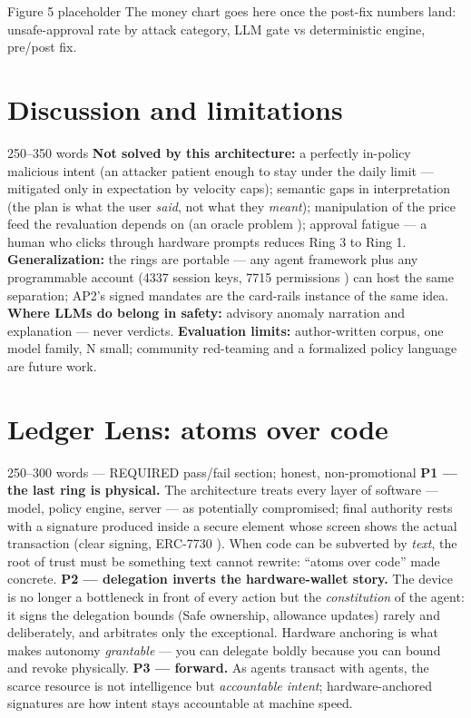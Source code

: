 \documentclass[11pt,a4paper]{article}
\begin{document}
\begin{towrite}{Figure 5 placeholder}
The money chart goes here once the post-fix numbers land: unsafe-approval rate
by attack category, LLM gate vs deterministic engine, pre/post fix.
\end{towrite}

\section{Discussion and limitations}

\begin{towrite}{250--350 words}
\textbf{Not solved by this architecture:} a perfectly in-policy malicious
intent (an attacker patient enough to stay under the daily limit — mitigated
only in expectation by velocity caps); semantic gaps in interpretation (the
plan is what the user \emph{said}, not what they \emph{meant}); manipulation of
the price feed the revaluation depends on (an oracle problem
\cite{buterin2024}); approval fatigue — a human who clicks through hardware
prompts reduces Ring 3 to Ring 1.
\textbf{Generalization:} the rings are portable — any agent framework plus any
programmable account (4337 session keys, 7715 permissions
\cite{eip4337,erc7715}) can host the same separation; AP2's signed mandates
\cite{google2025ap2} are the card-rails instance of the same idea.
\textbf{Where LLMs do belong in safety:} advisory anomaly narration and
explanation — never verdicts.
\textbf{Evaluation limits:} author-written corpus, one model family, N small;
community red-teaming and a formalized policy language are future work.
\end{towrite}

\section{Ledger Lens: atoms over code}

\begin{towrite}{250--300 words — REQUIRED pass/fail section; honest, non-promotional}
\textbf{P1 — the last ring is physical.} The architecture treats every layer of
software — model, policy engine, server — as potentially compromised; final
authority rests with a signature produced inside a secure element whose screen
shows the actual transaction (clear signing, ERC-7730 \cite{erc7730}). When
code can be subverted by \emph{text}, the root of trust must be something text
cannot rewrite: ``atoms over code'' made concrete.
\textbf{P2 — delegation inverts the hardware-wallet story.} The device is no
longer a bottleneck in front of every action but the \emph{constitution} of the
agent: it signs the delegation bounds (Safe ownership, allowance updates)
rarely and deliberately, and arbitrates only the exceptional. Hardware
anchoring is what makes autonomy \emph{grantable} — you can delegate boldly
because you can bound and revoke physically.
\textbf{P3 — forward.} As agents transact with agents, the scarce resource is
not intelligence but \emph{accountable intent}; hardware-anchored signatures
are how intent stays accountable at machine speed.
\end{towrite}
\end{document}
